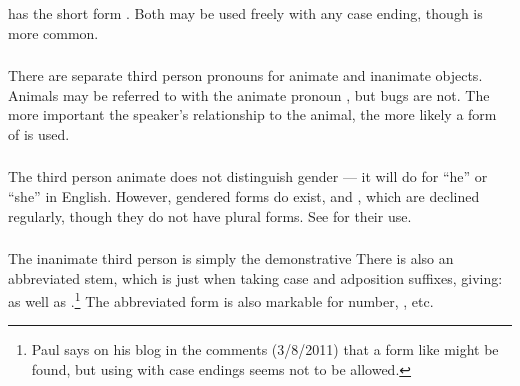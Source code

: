 \subsubsection{}  has the short form .
Both may be used freely with any case ending, though  is more
common.

\subsubsection{} There are separate third person pronouns for animate and
inanimate objects. Animals may be referred to with the animate
pronoun , but bugs are not. The more important the
speaker's relationship to the animal, the more likely a form of 
is used.

\subsubsection{} The third person animate  does not distinguish
gender --- it will do for ``he'' or ``she'' in English.  However,
gendered forms do exist,   and 
, which are declined regularly, though they do not have plural
forms.  See  for their use.
\label{morph:pron:gender}

\subsubsection{} The inanimate third person is simply the
demonstrative    There is also an abbreviated
stem,  which is just  when taking case and adposition
suffixes, giving:  as
well as .\footnote{Paul says on his blog in the comments
(3/8/2011) that a form like  might be found, but
using  with case endings seems not to be allowed.}  The
abbreviated form is also markable for number, , etc.
\label{morph:pron:tsa}

